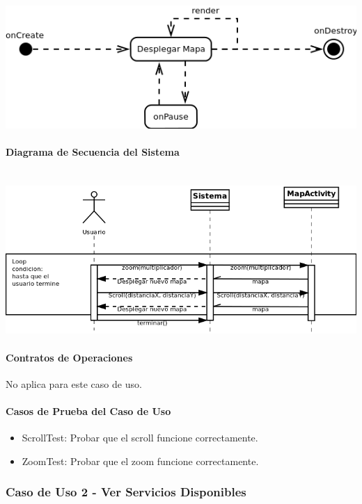 \documentclass[12pt]{article}
\begin{document}
\includegraphics[width=\linewidth]{"../Documentos/Diagramas/CU1_Estados"}

\newpage
\paragraph{Diagrama de Secuencia del Sistema}\ \\

\includegraphics[width=\linewidth]{"../Documentos/Diagramas/CU1_SecuenciaSistema"}

\paragraph{Contratos de Operaciones}
No aplica para este caso de uso.

\paragraph{Casos de Prueba del Caso de Uso}
\begin{itemize}
	\item{ScrollTest: Probar que el scroll funcione correctamente.}
	\item{ZoomTest: Probar que el zoom funcione correctamente.}
\end{itemize}

\newpage
\subsubsection{Caso de Uso 2 - Ver Servicios Disponibles}
\end{document}
